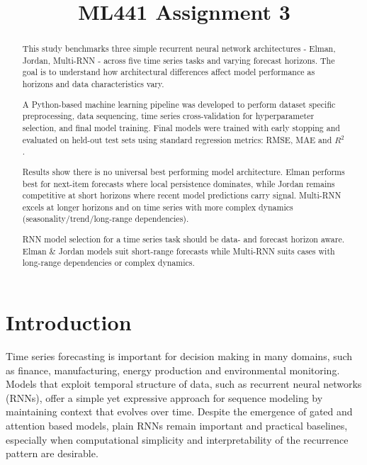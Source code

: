 \documentclass[conference]{IEEEtran}
\begin{document}
\title{ML441 Assignment 3}

\author{
}

\maketitle

\begin{abstract}
This study benchmarks three simple recurrent neural network architectures - Elman, Jordan, Multi-RNN - across five time series tasks and varying forecast horizons. The goal is to understand how architectural differences affect model performance as horizons and data characteristics vary.

A Python-based machine learning pipeline was developed to perform dataset specific preprocessing, data sequencing, time series cross-validation for hyperparameter selection, and final model training. Final models were trained with early stopping and evaluated on held-out test sets using standard regression metrics: RMSE, MAE and $R^2$.

Results show there is no universal best performing model architecture. Elman performs best for next-item forecasts where local persistence dominates, while Jordan remains competitive at short horizons where recent model predictions carry signal. Multi-RNN excels at longer horizons and on time series with more complex dynamics (seasonality/trend/long-range dependencies).

RNN model selection for a time series task should be data- and forecast horizon aware. Elman \& Jordan models suit short-range forecasts while Multi-RNN suits cases with long-range dependencies or complex dynamics.
\end{abstract}

\section{\textbf{Introduction}}

Time series forecasting is important for decision making in many domains, such as finance, manufacturing, energy production and environmental monitoring. Models that exploit temporal structure of data, such as recurrent neural networks (RNNs), offer a simple yet expressive approach for sequence modeling by maintaining context that evolves over time. Despite the emergence of gated and attention based models, plain RNNs remain important and practical baselines, especially when computational simplicity and interpretability of the recurrence pattern are desirable.
\end{document}
